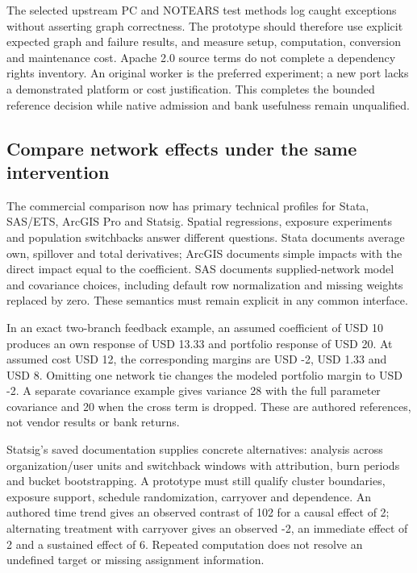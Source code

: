 The selected upstream PC and NOTEARS test methods log caught exceptions
without asserting graph correctness. The prototype should therefore use
explicit expected graph and failure results, and measure setup,
computation, conversion and maintenance cost. Apache 2.0 source terms do
not complete a dependency rights inventory. An original worker is the
preferred experiment; a new port lacks a demonstrated platform or cost
justification. This completes the bounded reference decision while
native admission and bank usefulness remain unqualified.
\citep{exec20_gcastle_source}

\hypertarget{compare-network-effects-under-the-same-intervention}{%
\subsection{Compare network effects under the same
intervention}\label{compare-network-effects-under-the-same-intervention}}

The commercial comparison now has primary technical profiles for Stata,
SAS/ETS, ArcGIS Pro and Statsig. Spatial regressions, exposure
experiments and population switchbacks answer different questions. Stata
documents average own, spillover and total derivatives; ArcGIS documents
simple impacts with the direct impact equal to the coefficient. SAS
documents supplied-network model and covariance choices, including
default row normalization and missing weights replaced by zero. These
semantics must remain explicit in any common interface.
\citep{exec20_network_stata_spregress,exec20_network_stata_impacts,exec20_network_stata_panel,exec20_network_sas_latest_spatial,exec20_network_arcgis_method,exec20_network_arcgis_tool}

In an exact two-branch feedback example, an assumed coefficient of USD
10 produces an own response of USD 13.33 and portfolio response of USD
20. At assumed cost USD 12, the corresponding margins are USD -2, USD
1.33 and USD 8. Omitting one network tie changes the modeled portfolio
margin to USD -2. A separate covariance example gives variance 28 with
the full parameter covariance and 20 when the cross term is dropped.
These are authored references, not vendor results or bank returns.
\citep{exec20_network_reference}

Statsig's saved documentation supplies concrete alternatives: analysis
across organization/user units and switchback windows with attribution,
burn periods and bucket bootstrapping. A prototype must still qualify
cluster boundaries, exposure support, schedule randomization, carryover
and dependence. An authored time trend gives an observed contrast of 102
for a causal effect of 2; alternating treatment with carryover gives an
observed -2, an immediate effect of 2 and a sustained effect of 6.
Repeated computation does not resolve an undefined target or missing
assignment information.
\citep{exec20_network_statsig_types,exec20_network_statsig_units,exec20_network_statsig_switchback,exec20_network_reference}

